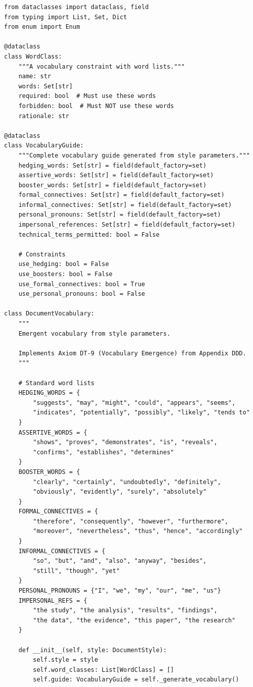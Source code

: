 \begin{verbatim}
from dataclasses import dataclass, field
from typing import List, Set, Dict
from enum import Enum

@dataclass
class WordClass:
    """A vocabulary constraint with word lists."""
    name: str
    words: Set[str]
    required: bool  # Must use these words
    forbidden: bool  # Must NOT use these words
    rationale: str

@dataclass
class VocabularyGuide:
    """Complete vocabulary guide generated from style parameters."""
    hedging_words: Set[str] = field(default_factory=set)
    assertive_words: Set[str] = field(default_factory=set)
    booster_words: Set[str] = field(default_factory=set)
    formal_connectives: Set[str] = field(default_factory=set)
    informal_connectives: Set[str] = field(default_factory=set)
    personal_pronouns: Set[str] = field(default_factory=set)
    impersonal_references: Set[str] = field(default_factory=set)
    technical_terms_permitted: bool = False

    # Constraints
    use_hedging: bool = False
    use_boosters: bool = False
    use_formal_connectives: bool = True
    use_personal_pronouns: bool = False

class DocumentVocabulary:
    """
    Emergent vocabulary from style parameters.

    Implements Axiom DT-9 (Vocabulary Emergence) from Appendix DDD.
    """

    # Standard word lists
    HEDGING_WORDS = {
        "suggests", "may", "might", "could", "appears", "seems",
        "indicates", "potentially", "possibly", "likely", "tends to"
    }
    ASSERTIVE_WORDS = {
        "shows", "proves", "demonstrates", "is", "reveals",
        "confirms", "establishes", "determines"
    }
    BOOSTER_WORDS = {
        "clearly", "certainly", "undoubtedly", "definitely",
        "obviously", "evidently", "surely", "absolutely"
    }
    FORMAL_CONNECTIVES = {
        "therefore", "consequently", "however", "furthermore",
        "moreover", "nevertheless", "thus", "hence", "accordingly"
    }
    INFORMAL_CONNECTIVES = {
        "so", "but", "and", "also", "anyway", "besides",
        "still", "though", "yet"
    }
    PERSONAL_PRONOUNS = {"I", "we", "my", "our", "me", "us"}
    IMPERSONAL_REFS = {
        "the study", "the analysis", "results", "findings",
        "the data", "the evidence", "this paper", "the research"
    }

    def __init__(self, style: DocumentStyle):
        self.style = style
        self.word_classes: List[WordClass] = []
        self.guide: VocabularyGuide = self._generate_vocabulary()


\end{verbatim}
